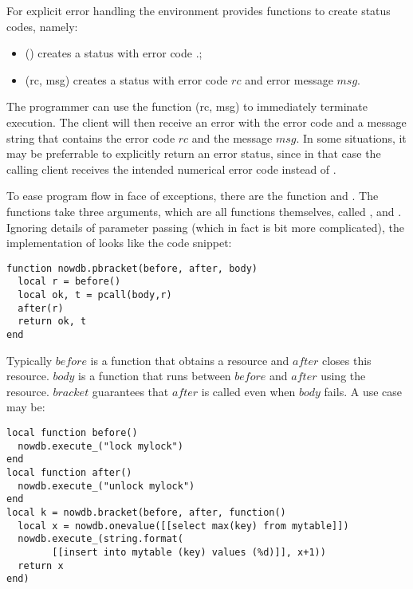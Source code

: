 For explicit error handling
the environment provides functions to
create status codes, namely:

\begin{minipage}{\textwidth}
\begin{itemize}
\item {}() creates a status with error code
.;
\item {}(rc, msg) creates a status with error code $rc$ and
error message $msg$.
\end{itemize}
\end{minipage}

The programmer can use the function
(rc, msg) to immediately terminate
execution. The client will then receive an error
with the error code  and a message string
that contains the error code $rc$ and the message $msg$.
In some situations, it may be preferrable
to explicitly return an error status, since in that case
the calling client receives the intended numerical
error code instead of .

To ease program flow in face of exceptions,
there are the function  and
.
The functions take three arguments,
which are all functions themselves, called
,  and .
Ignoring details of parameter passing
(which in fact is bit more complicated),
the implementation of  looks
like the code snippet:

\begin{lua}
\begin{lstlisting}
function nowdb.pbracket(before, after, body)
  local r = before()
  local ok, t = pcall(body,r)
  after(r)
  return ok, t
end
\end{lstlisting}
\end{lua}

Typically $before$ is a function that obtains a resource
and $after$ closes this resource. $body$ is a function
that runs between $before$ and $after$ using the resource.
$bracket$ guarantees that $after$ is called
even when $body$ fails. A use case may be:

\begin{lua}
\begin{lstlisting}
local function before() 
  nowdb.execute_("lock mylock")
end
local function after()
  nowdb.execute_("unlock mylock")
end
local k = nowdb.bracket(before, after, function()
  local x = nowdb.onevalue([[select max(key) from mytable]])
  nowdb.execute_(string.format(
        [[insert into mytable (key) values (%d)]], x+1))
  return x
end)
\end{lstlisting}
\end{lua}

